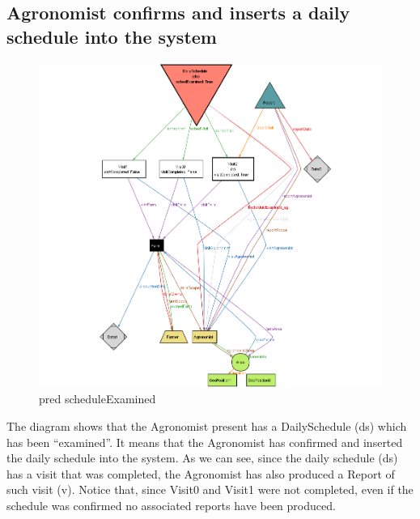 \documentclass[10pt]{report}
\begin{document}
\subsection{Agronomist confirms and inserts a daily schedule into the system}
\begin{figure}[H]
    \centering
    \includegraphics[width=450px]{Alloy/scheduleExamined.png}
    \caption{pred scheduleExamined}
\end{figure}
The diagram shows that the Agronomist present has a DailySchedule (ds) which has been “examined”. It means that the Agronomist has confirmed and inserted the daily schedule into the system. As we can see, since the daily schedule (ds) has a visit that was completed, the Agronomist has also produced a Report of such visit (v). Notice that, since Visit0 and Visit1 were not completed, even if the schedule was confirmed no associated reports have been produced.
\end{document}
